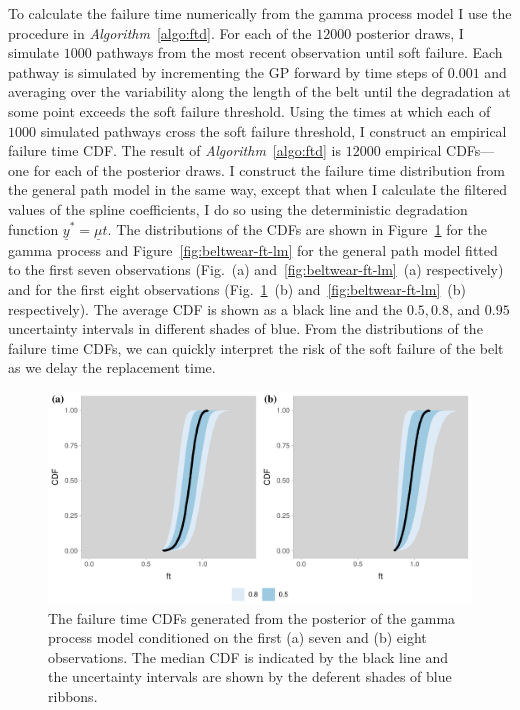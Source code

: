 To calculate the failure time numerically from the gamma process model I use the procedure in \textit{Algorithm}~\ref{algo:ftd}. For each of the $12000$ posterior draws, I simulate $1000$ pathways from the most recent observation until soft failure. Each pathway is simulated by incrementing the GP forward by time steps of $0.001$ and averaging over the variability along the length of the belt until the degradation at some point exceeds the soft failure threshold. Using the times at which each of $1000$ simulated pathways cross the soft failure threshold, I construct an empirical failure time CDF. The result of \textit{Algorithm}~\ref{algo:ftd} is $12000$ empirical CDFs---one for each of the posterior draws. I construct the failure time distribution from the general path model in the same way, except that when I calculate the filtered values of the spline coefficients, I do so using the deterministic degradation function $\underline{y}^* = \underline{\mu} t$. The distributions of the CDFs are shown in Figure~\ref{fig:beltwear-ft-gp} for the gamma process and Figure~\ref{fig:beltwear-ft-lm} for the general path model fitted to the first seven observations (Fig.~(a) and~\ref{fig:beltwear-ft-lm}~(a) respectively) and for the first eight observations (Fig.~\ref{fig:beltwear-ft-gp}~(b) and~\ref{fig:beltwear-ft-lm}~(b) respectively). The average CDF is shown as a black line and the $0.5, 0.8$, and $0.95$ uncertainty intervals in different shades of blue. From the distributions of the failure time CDFs, we can quickly interpret the risk of the soft failure of the belt as we delay the replacement time.

\begin{figure}
  \centering
  \includegraphics[width=\textwidth]{figures/ch-6/belt_wear_failuretime_CDF_gp.pdf}
  \caption{The failure time CDFs generated from the posterior of the gamma process model conditioned on the first (a) seven and (b) eight observations. The median CDF is indicated by the black line and the uncertainty intervals are shown by the deferent shades of blue ribbons.}
  \label{fig:beltwear-ft-gp}
\end{figure}


